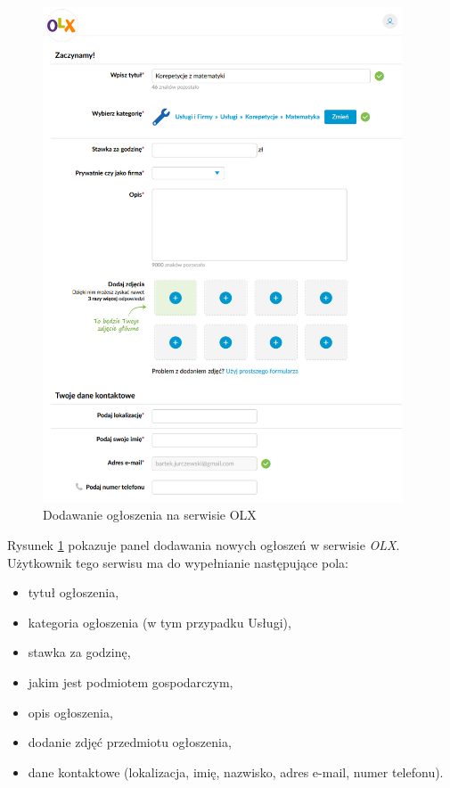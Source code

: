 \documentclass[12pt]{article}
\numberwithin{figure}{section}
\begin{document}
\begin{sloppypar}
    \begin{figure}[!htbp]
    	\centering
    	\includegraphics[width=0.95\textwidth]{images/chapter_2/olx-add-announcement.png}
    	\caption{Dodawanie ogłoszenia na serwisie OLX}
    	\label{fig:olx-add-announcement}
    \end{figure}

Rysunek \ref{fig:olx-add-announcement} pokazuje panel dodawania nowych ogłoszeń w serwisie \textit{OLX}. 
Użytkownik tego serwisu ma do wypełnianie następujące pola:
\begin{itemize}
    \item tytuł ogłoszenia,
    \item kategoria ogłoszenia (w tym przypadku Usługi),
    \item stawka za godzinę,
    \item jakim jest podmiotem gospodarczym,
    \item opis ogłoszenia,
    \item dodanie zdjęć przedmiotu ogłoszenia,
    \item dane kontaktowe (lokalizacja, imię, nazwisko, adres e-mail, numer telefonu).
\end{itemize}


\end{sloppypar}
\end{document}
